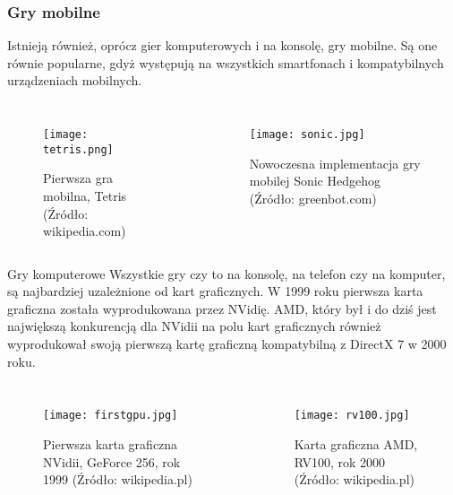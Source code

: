 \documentclass{beamer}
\begin{document}
\begin{frame}
\frametitle{Gry mobilne}
    Istnieją również, oprócz gier komputerowych i na konsolę, gry mobilne. Są one równie popularne, gdyż występują na wszystkich smartfonach i kompatybilnych urządzeniach mobilnych.
    \break
    \begin{columns}
            \begin{figure}
                \texttt{[image: tetris.png]}
                \caption{Pierwsza gra mobilna, Tetris (Źródło: wikipedia.com)}
            \end{figure}
            \begin{figure}
                \texttt{[image: sonic.jpg]}
                \caption{Nowoczesna implementacja gry mobilej Sonic Hedgehog (Źródło: greenbot.com)}
            \end{figure}
    \end{columns}
\end{frame}


\begin{frame}{Gry komputerowe}
    Wszystkie gry czy to na konsolę, na telefon czy na komputer, są najbardziej uzależnione od kart graficznych. W 1999 roku pierwsza karta graficzna została wyprodukowana przez NVidię. AMD, który był i do dziś jest największą konkurencją dla NVidii na polu kart graficznych również wyprodukował swoją pierwszą kartę graficzną kompatybilną z DirectX 7 w 2000 roku.
    \break
    \begin{columns}
            \begin{figure}
               \small \texttt{[image: firstgpu.jpg]}
                \caption{Pierwsza karta graficzna NVidii, GeForce 256, rok 1999 (Źródło: wikipedia.pl)}
            \end{figure}
            \begin{figure}
               \small \texttt{[image: rv100.jpg]}
                \caption{Karta graficzna AMD, RV100, rok 2000 (Źródło: wikipedia.pl)}
            \end{figure}
    \end{columns}
\end{frame}

\end{document}
